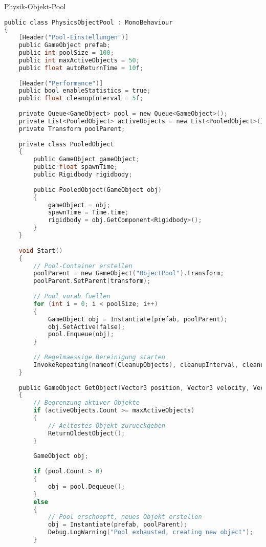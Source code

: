 \begin{code}{Physik-Objekt-Pool}
\begin{lstlisting}[language=C, style=basesmol]
public class PhysicsObjectPool : MonoBehaviour 
{
    [Header("Pool-Einstellungen")]
    public GameObject prefab;
    public int poolSize = 100;
    public int maxActiveObjects = 50;
    public float autoReturnTime = 10f;
    
    [Header("Performance")]
    public bool enableStatistics = true;
    public float cleanupInterval = 5f;
    
    private Queue<GameObject> pool = new Queue<GameObject>();
    private List<PooledObject> activeObjects = new List<PooledObject>();
    private Transform poolParent;
    
    private class PooledObject 
    {
        public GameObject gameObject;
        public float spawnTime;
        public Rigidbody rigidbody;
        
        public PooledObject(GameObject obj) 
        {
            gameObject = obj;
            spawnTime = Time.time;
            rigidbody = obj.GetComponent<Rigidbody>();
        }
    }
    
    void Start() 
    {
        // Pool-Container erstellen
        poolParent = new GameObject("ObjectPool").transform;
        poolParent.SetParent(transform);
        
        // Pool vorab fuellen
        for (int i = 0; i < poolSize; i++) 
        {
            GameObject obj = Instantiate(prefab, poolParent);
            obj.SetActive(false);
            pool.Enqueue(obj);
        }
        
        // Regelmaessige Bereinigung starten
        InvokeRepeating(nameof(CleanupObjects), cleanupInterval, cleanupInterval);
    }
    
    public GameObject GetObject(Vector3 position, Vector3 velocity, Vector3 angularVelocity = default) 
    {
        // Begrenzung aktiver Objekte
        if (activeObjects.Count >= maxActiveObjects) 
        {
            // Aeltestes Objekt zurueckgeben
            ReturnOldestObject();
        }
        
        GameObject obj;
        
        if (pool.Count > 0) 
        {
            obj = pool.Dequeue();
        } 
        else 
        {
            // Pool erschoepft, neues Objekt erstellen
            obj = Instantiate(prefab, poolParent);
            Debug.LogWarning("Pool exhausted, creating new object");
        }
        

\end{lstlisting}
\end{code}
